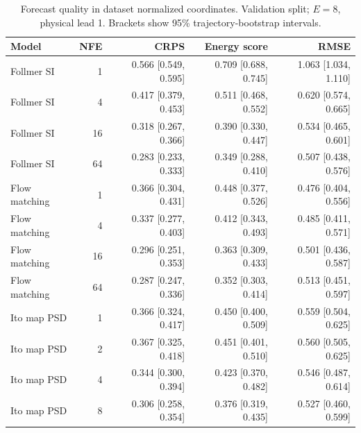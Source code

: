 \begin{table}[t]
\centering
\small
\setlength{\tabcolsep}{3pt}
\caption{Forecast quality in dataset normalized coordinates. Validation split; $E=8$, physical lead 1. Brackets show 95\% trajectory-bootstrap intervals.}
\label{tab:map-quality}
\begin{tabular}{lrrrr}
\toprule
Model & NFE & CRPS & Energy score & RMSE \\
\midrule
Follmer SI & 1 & 0.566 [0.549, 0.595] & 0.709 [0.688, 0.745] & 1.063 [1.034, 1.110] \\
Follmer SI & 4 & 0.417 [0.379, 0.453] & 0.511 [0.468, 0.552] & 0.620 [0.574, 0.665] \\
Follmer SI & 16 & 0.318 [0.267, 0.366] & 0.390 [0.330, 0.447] & 0.534 [0.465, 0.601] \\
Follmer SI & 64 & 0.283 [0.233, 0.333] & 0.349 [0.288, 0.410] & 0.507 [0.438, 0.576] \\
\addlinespace
Flow matching & 1 & 0.366 [0.304, 0.431] & 0.448 [0.377, 0.526] & 0.476 [0.404, 0.556] \\
Flow matching & 4 & 0.337 [0.277, 0.403] & 0.412 [0.343, 0.493] & 0.485 [0.411, 0.571] \\
Flow matching & 16 & 0.296 [0.251, 0.353] & 0.363 [0.309, 0.433] & 0.501 [0.436, 0.587] \\
Flow matching & 64 & 0.287 [0.247, 0.336] & 0.352 [0.303, 0.414] & 0.513 [0.451, 0.597] \\
\addlinespace
Ito map PSD & 1 & 0.366 [0.324, 0.417] & 0.450 [0.400, 0.509] & 0.559 [0.504, 0.625] \\
Ito map PSD & 2 & 0.367 [0.325, 0.418] & 0.451 [0.401, 0.510] & 0.560 [0.505, 0.625] \\
Ito map PSD & 4 & 0.344 [0.300, 0.394] & 0.423 [0.370, 0.482] & 0.546 [0.487, 0.614] \\
Ito map PSD & 8 & 0.306 [0.258, 0.354] & 0.376 [0.319, 0.435] & 0.527 [0.460, 0.599] \\
\bottomrule
\end{tabular}
\end{table}
